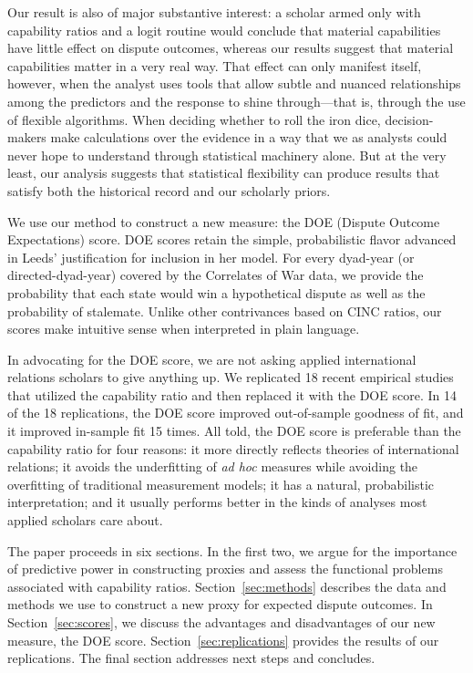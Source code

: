 Our result is also of major substantive interest:  a scholar armed only with capability ratios and a logit routine would conclude that material capabilities have little effect on dispute outcomes, whereas our results suggest that material capabilities matter in a very real way.  That effect can only manifest itself, however, when the analyst uses tools that allow subtle and nuanced relationships among the predictors and the response to shine through---that is, through the use of flexible algorithms.  When deciding whether to roll the iron dice, decision-makers make calculations over the evidence in a way that we as analysts could never hope to understand through statistical machinery alone.  But at the very least, our analysis suggests that statistical flexibility can produce results that satisfy both the historical record and our scholarly priors.

We use our method to construct a new measure:  the DOE (Dispute Outcome Expectations) score.  DOE scores retain the simple, probabilistic flavor advanced in Leeds' justification for inclusion in her model.
For every dyad-year (or directed-dyad-year) covered by the Correlates of War data, we provide the probability that each state would win a hypothetical dispute as well as the probability of stalemate.
Unlike other contrivances based on CINC ratios, our scores make intuitive sense when interpreted in plain language.

In advocating for the DOE score, we are not asking applied international relations scholars to give anything up.
We replicated 18 recent empirical studies that utilized the capability ratio and then replaced it with the DOE score.
In 14 of the 18 replications, the DOE score improved out-of-sample goodness of fit, and it improved in-sample fit 15 times.
All told, the DOE score is preferable than the capability ratio for four reasons: it more directly reflects theories of international relations; it avoids the underfitting of \emph{ad hoc} measures while avoiding the overfitting of traditional measurement models; it has a natural, probabilistic interpretation; and it usually performs better in the kinds of analyses most applied scholars care about.

The paper proceeds in six sections.
In the first two, we argue for the importance of predictive power in constructing proxies and assess the functional problems associated with capability ratios.
Section~\ref{sec:methods} describes the data and methods we use to construct a new proxy for expected dispute outcomes.
In Section~\ref{sec:scores}, we discuss the advantages and disadvantages of our new measure, the DOE score.
Section~\ref{sec:replications} provides the results of our replications.
The final section addresses next steps and concludes.

